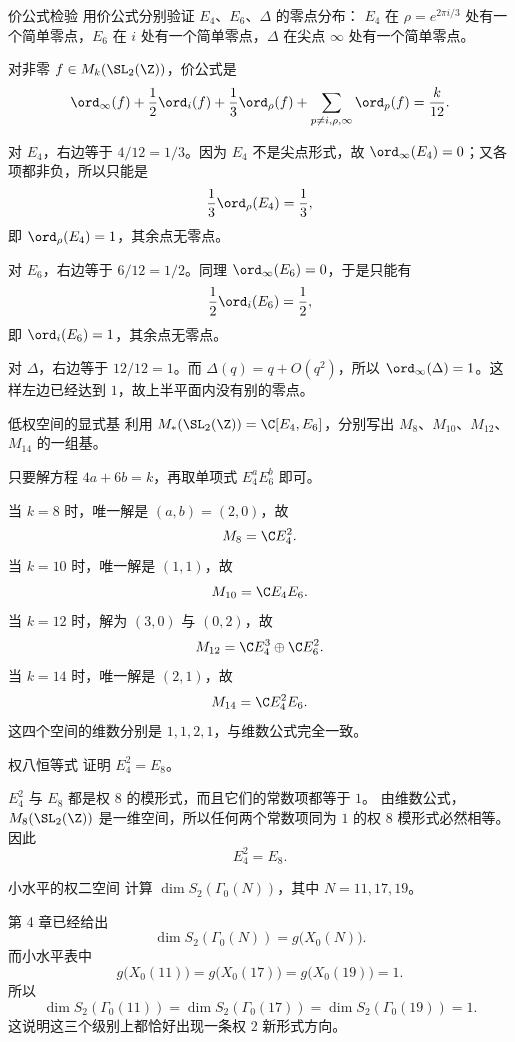 \begin{problem}{价公式检验}
\easy
用价公式分别验证 $E_4$、$E_6$、$\Delta$ 的零点分布：
$E_4$ 在 $\rho=e^{2\pi i/3}$ 处有一个简单零点，$E_6$ 在 $i$ 处有一个简单零点，$\Delta$ 在尖点 $\infty$ 处有一个简单零点。
\end{problem}
\begin{solution}
对非零 $f\in M_k(\SL_2(\Z))$，价公式是
\[
\ord_\infty(f)+\frac{1}{2}\ord_i(f)+\frac{1}{3}\ord_\rho(f)+
\sum_{p\ne i,\rho,\infty}\ord_p(f)=\frac{k}{12}.
\]

对 $E_4$，右边等于 $4/12=1/3$。因为 $E_4$ 不是尖点形式，故 $\ord_\infty(E_4)=0$；又各项都非负，所以只能是
\[
\frac{1}{3}\ord_\rho(E_4)=\frac{1}{3},
\]
即 $\ord_\rho(E_4)=1$，其余点无零点。

对 $E_6$，右边等于 $6/12=1/2$。同理 $\ord_\infty(E_6)=0$，于是只能有
\[
\frac{1}{2}\ord_i(E_6)=\frac{1}{2},
\]
即 $\ord_i(E_6)=1$，其余点无零点。

对 $\Delta$，右边等于 $12/12=1$。而 $\Delta(q)=q+O(q^2)$，所以 $\ord_\infty(\Delta)=1$。这样左边已经达到 $1$，故上半平面内没有别的零点。
\end{solution}

\begin{problem}{低权空间的显式基}
\easy
利用 $M_*(\SL_2(\Z))=\C[E_4,E_6]$，分别写出 $M_8$、$M_{10}$、$M_{12}$、$M_{14}$ 的一组基。
\end{problem}
\begin{solution}
只要解方程 $4a+6b=k$，再取单项式 $E_4^aE_6^b$ 即可。

当 $k=8$ 时，唯一解是 $(a,b)=(2,0)$，故
\[
M_8=\C E_4^2.
\]
当 $k=10$ 时，唯一解是 $(1,1)$，故
\[
M_{10}=\C E_4E_6.
\]
当 $k=12$ 时，解为 $(3,0)$ 与 $(0,2)$，故
\[
M_{12}=\C E_4^3\oplus \C E_6^2.
\]
当 $k=14$ 时，唯一解是 $(2,1)$，故
\[
M_{14}=\C E_4^2E_6.
\]
这四个空间的维数分别是 $1,1,2,1$，与维数公式完全一致。
\end{solution}

\begin{problem}{权八恒等式}
\easy
证明 $E_4^2=E_8$。
\end{problem}
\begin{solution}
$E_4^2$ 与 $E_8$ 都是权 $8$ 的模形式，而且它们的常数项都等于 $1$。
由维数公式，$M_8(\SL_2(\Z))$ 是一维空间，所以任何两个常数项同为 $1$ 的权 $8$ 模形式必然相等。
因此
\[
E_4^2=E_8.
\]
\end{solution}

\begin{problem}{小水平的权二空间}
\easy
计算 $\dim S_2(\Gamma_0(N))$，其中 $N=11,17,19$。
\end{problem}
\begin{solution}
第 4 章已经给出
\[
\dim S_2(\Gamma_0(N))=g\bigl(X_0(N)\bigr).
\]
而小水平表中
\[
g\bigl(X_0(11)\bigr)=g\bigl(X_0(17)\bigr)=g\bigl(X_0(19)\bigr)=1.
\]
所以
\[
\dim S_2(\Gamma_0(11))=
\dim S_2(\Gamma_0(17))=
\dim S_2(\Gamma_0(19))=1.
\]
这说明这三个级别上都恰好出现一条权 $2$ 新形式方向。
\end{solution}

